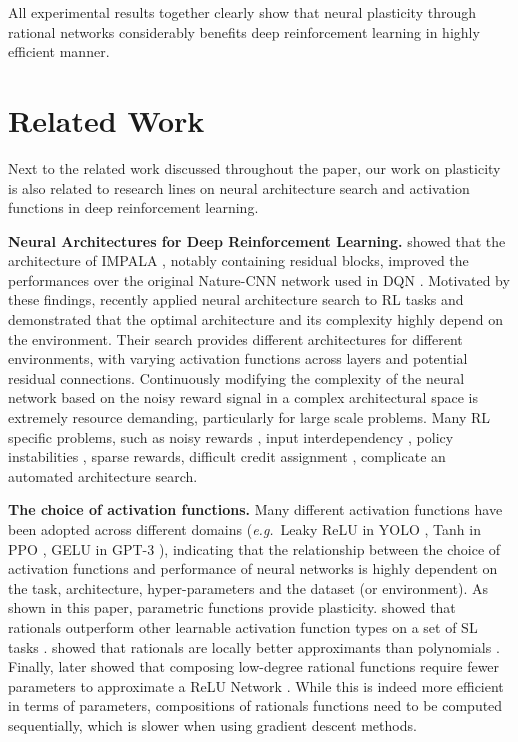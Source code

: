 \documentclass[accepted]{article}
\theoremstyle{plain}
\theoremstyle{definition}
\theoremstyle{remark}
\newcommand{\eg}{\emph{e.g.}~}
\begin{document}
All experimental results together clearly show that neural plasticity through rational networks considerably benefits deep reinforcement learning in highly efficient manner.

\section{Related Work}
Next to the related work discussed throughout the paper, our work on plasticity is also related to research lines on neural architecture search and activation functions in deep reinforcement learning. 



\textbf{Neural Architectures for Deep Reinforcement Learning.}
\citeauthor{Cobbe2019QuantifyingGI} showed that the architecture of IMPALA \citep{Espeholt18IMPALA}, notably containing residual blocks, improved the performances over the original Nature-CNN network used in DQN . Motivated by these findings, \cite{miao2021rldarts} recently applied neural architecture search to RL tasks and demonstrated that the optimal architecture and its complexity highly depend on the environment. Their search provides different architectures for different environments, with varying activation functions across layers and potential residual connections.
Continuously modifying the complexity of the neural network based on the noisy reward signal in a complex architectural space is extremely resource demanding, particularly for large scale problems. Many RL specific problems, such as noisy rewards \citep{henderson2018matters}, input interdependency \citep{mnih2015human}, policy instabilities \citep{Haarnoja2018SAC}, sparse rewards, difficult credit assignment \citep{Mesnard2021credit}, complicate an automated architecture search. 

\textbf{The choice of activation functions.}
Many different activation functions have been adopted across different domains (\eg Leaky ReLU in YOLO \citep{RedmonDGF16}, Tanh in PPO \citep{SchulmanWDRK17}, GELU in GPT-3 \citep{BrownMRSKDNSSAA20}), indicating that the relationship between the choice of activation functions and performance of neural networks is highly dependent on the task, architecture, hyper-parameters and the dataset (or environment). As shown in this paper, parametric functions provide plasticity. \citeauthor{molina2019pad} showed that rationals outperform other learnable activation function types on a set of SL tasks . \citeauthor{telgarsky2017neural} showed that rationals are locally better approximants than polynomials . Finally, \citeauthor{BoulleNT20} later showed that composing low-degree rational functions require fewer parameters to approximate a ReLU Network . While this is indeed more efficient in terms of parameters, compositions of rationals functions need to be computed sequentially, which is slower when using gradient descent methods. 
\end{document}
